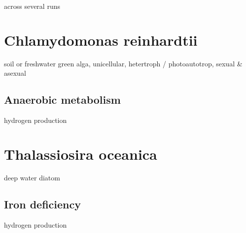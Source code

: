 \begin{todo}
across several runs
\end{todo}

\section{Chlamydomonas reinhardtii}

\begin{todo}
soil or freshwater green alga, unicellular, hetertroph / photoautotrop, sexual & asexual
\end{todo}

\subsection{Anaerobic metabolism}

\begin{todo}
hydrogen production
\end{todo}

\section{Thalassiosira oceanica}

\begin{todo}
deep water diatom
\end{todo}

\subsection{Iron deficiency}

\begin{todo}
hydrogen production
\end{todo}
